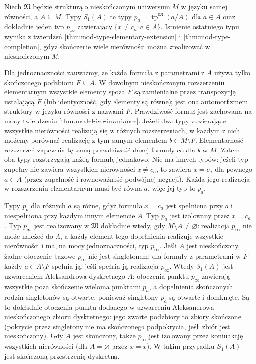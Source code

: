 \begin{przyklad}
\label{ex:mod-type-pure-equality}
Niech $\mathfrak M$ będzie strukturą o nieskończonym
uniwersum $M$ w języku samej równości, a $A\subseteq M$. Typy $S_1(A)$ to typy
$p_a=\operatorname{tp}^{\mathfrak M}(a/A)$ dla $a\in A$
oraz dokładnie jeden typ $p_\infty$ zawierający
$\{x\ne c_a:a\in A\}$.
Istnienie ostatniego typu wynika z twierdzeń
\ref{thm:mod-type-elementary-extension} i
\ref{thm:mod-type-completion}, gdyż skończenie wiele
nierówności można zrealizować w nieskończonym $M$.

Dla jednoznaczności zauważmy, że każda formuła z parametrami
z $A$ używa tylko skończonego podzbioru $F\subseteq A$.
W dowolnym nieskończonym rozszerzeniu elementarnym
wszystkie elementy spoza $F$ są zamienialne przez
transpozycję ustalającą $F$ (lub identyczność, gdy elementy
są równe); jest ona automorfizmem struktury w języku
równości z nazwami $F$. Prawdziwość formuł jest zachowana
na mocy twierdzenia \ref{thm:model-iso-invariance}. Jeżeli dwa typy zawierające
wszystkie nierówności realizują się w różnych rozszerzeniach,
w każdym z nich możemy porównać realizację z tym samym
elementem $b\in M\setminus F$. Elementarność rozszerzeń
zapewnia tę samą prawdziwość danej formuły co dla $b$ w $M$.
Zatem oba typy rozstrzygają każdą formułę jednakowo.
Nie ma innych typów: jeżeli typ zupełny nie zawiera
wszystkich nierówności $x\ne c_a$, to zawiera $x=c_a$
dla pewnego $a\in A$ (przez zupełność i równoważność
podwójnej negacji). Każda jego realizacja w rozszerzeniu
elementarnym musi być równa $a$, więc jej typ to $p_a$.

Typy $p_a$ dla różnych $a$ są różne, gdyż formuła $x=c_a$
jest spełniona przy $a$ i niespełniona przy każdym innym
elemencie $A$. Typ $p_a$ jest izolowany przez $x=c_a$.
Typ $p_\infty$ jest realizowany w $\mathfrak M$ dokładnie
wtedy, gdy $M\setminus A\ne\varnothing$: realizacja
$p_\infty$ nie może należeć do $A$, a każdy element
tego dopełnienia realizuje wszystkie nierówności i ma,
na mocy jednoznaczności, typ $p_\infty$. Jeśli $A$ jest
nieskończony, żadne otoczenie bazowe $p_\infty$ nie jest
singletonem: dla formuły z parametrami w $F$ każdy
$a\in A\setminus F$ spełnia ją, jeśli spełnia ją realizacja
$p_\infty$. Wtedy $S_1(A)$ jest uzwarceniem Aleksandrowa
dyskretnego $A$: otoczenia punktu $p_\infty$ zawierają
wszystkie poza skończenie wieloma punktami $p_a$,
a dopełnienia skończonych rodzin singletonów są otwarte,
ponieważ singletony $p_a$ są otwarte i domknięte.
Są to dokładnie otoczenia punktu dodanego w uzwarceniu
Aleksandrowa nieskończonego zbioru dyskretnego: jego
zwarte podzbiory to zbiory skończone (pokrycie przez
singletony nie ma skończonego podpokrycia, jeśli zbiór
jest nieskończony).
Gdy $A$ jest skończony, także $p_\infty$ jest izolowany
przez koniunkcję wszystkich nierówności (dla $A=\varnothing$
przez $x=x$). W takim przypadku $S_1(A)$ jest skończoną
przestrzenią dyskretną.
\end{przyklad}

